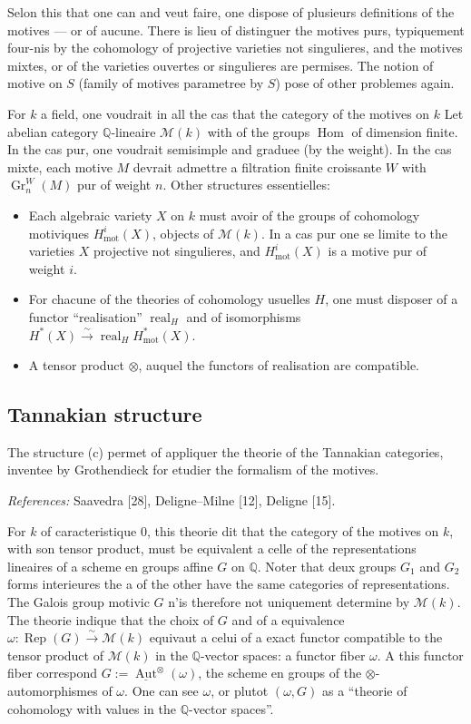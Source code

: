 \documentclass[11pt,a4paper]{article}
\theoremstyle{plain}
\theoremstyle{definition}
\DeclareMathOperator{\Hom}{Hom}
\DeclareMathOperator{\Aut}{Aut}
\DeclareMathOperator{\Rep}{Rep}
\DeclareMathOperator{\Gr}{Gr}
\newcommand{\Q}{\mathbb{Q}}
\DeclareMathOperator{\mot}{mot}
\DeclareMathOperator{\real}{real}
\begin{document}
Selon this that one can and veut faire, one dispose of plusieurs definitions of the
motives --- or of aucune. There is lieu of distinguer the motives purs, typiquement
four-nis by the cohomology of projective varieties not singulieres, and the motives
mixtes, or of the varieties ouvertes or singulieres are permises. The notion of
motive on $S$ (family of motives parametree by $S$) pose of other problemes again.

For $k$ a field, one voudrait in all the cas that the category of the motives on $k$ Let abelian category $\Q$-lineaire $\mathcal{M}(k)$ with of the groups
$\Hom$ of dimension finite. In the cas pur, one voudrait semisimple and
graduee (by the weight). In the cas mixte, each motive $M$ devrait admettre
a filtration finite croissante $W$ with $\Gr_n^W(M)$ pur of weight $n$. Other
structures essentielles:

\begin{itemize}
\item[(a)] Each algebraic variety $X$ on $k$ must avoir of the groups of cohomology motiviques $H^i_{\mot}(X)$, objects of $\mathcal{M}(k)$. In a cas pur one se limite to the varieties $X$ projective not singulieres, and $H^i_{\mot}(X)$ is a motive pur of weight $i$.

\item[(b)] For chacune of the theories of cohomology usuelles $H$, one must disposer of a functor ``realisation'' $\real_H$ and of isomorphisms $H^*(X) \xrightarrow{\sim} \real_H H^*_{\mot}(X)$.

\item[(c)] A tensor product $\otimes$, auquel the functors of realisation are compatible.
\end{itemize}

\subsection{Tannakian structure}

The structure (c) permet of appliquer the theorie of the Tannakian categories,
inventee by Grothendieck for etudier the formalism of the motives.

\textit{References:} Saavedra [28], Deligne--Milne [12], Deligne [15].

For $k$ of caracteristique $0$, this theorie dit that the category of the motives on $k$, with son tensor product, must be equivalent a celle of the representations lineaires of a scheme en groups affine $G$ on $\Q$. Noter that deux groups $G_1$ and $G_2$ forms interieures the a of the other have the same categories of representations. The Galois group motivic $G$ n'is therefore not uniquement determine by $\mathcal{M}(k)$. The theorie indique that the choix of $G$ and of a equivalence $\omega: \Rep(G) \xrightarrow{\sim} \mathcal{M}(k)$ equivaut a celui of a exact functor compatible to the tensor product of $\mathcal{M}(k)$ in the $\Q$-vector spaces: a functor fiber $\omega$. A this functor fiber correspond $G := \underline{\Aut}^{\otimes}(\omega)$, the scheme en groups of the $\otimes$-automorphismes of $\omega$. One can see $\omega$, or plutot $(\omega, G)$ as a ``theorie of cohomology with values in the $\Q$-vector spaces''.
\end{document}
